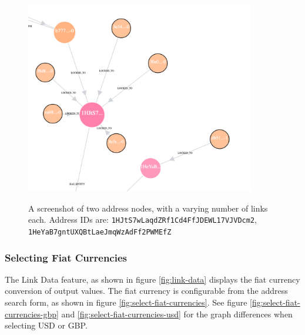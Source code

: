 \begin{figure}[h!]
  \centering
  \includegraphics[width = 10cm]{./figures/ui-screenshots/link-dependant-size-colour}\\[0.5cm] 
  \caption{A screenshot of two address nodes, with a varying number of links each.
  Address IDs are: \texttt{1HJtS7wLaqdZRf1Cd4FfJDEWL17VJVDcm2},\\\texttt{1HeYaB7gntUXQBtLaeJmqWzAdFf2PWMEfZ}}
  \label{fig:address-nodes-colour-size-change}
\end{figure}

\subsubsection{Selecting Fiat Currencies}
The Link Data feature, as shown in figure \ref{fig:link-data} displays the fiat currency conversion of output values. The fiat currency is configurable from the address search form, as shown in figure \ref{fig:select-fiat-currencies}. See figure \ref{fig:select-fiat-currencies-gbp} and \ref{fig:select-fiat-currencies-usd} for the graph differences when selecting USD or GBP. 


